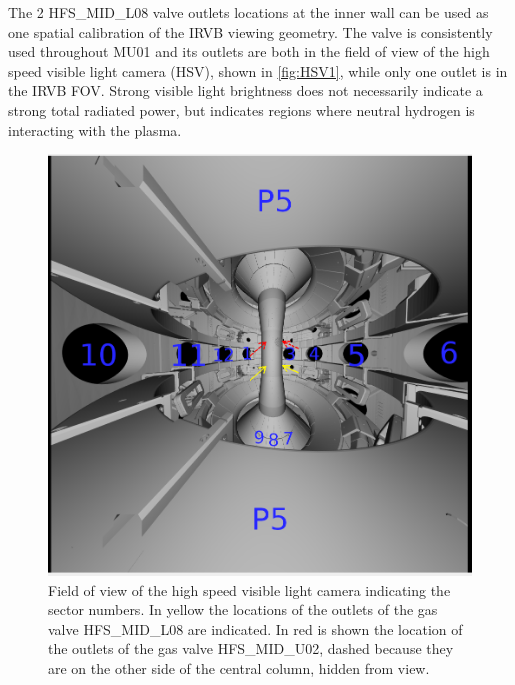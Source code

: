 
The 2 HFS\_MID\_L08 valve outlets locations at the inner wall can be used as one spatial calibration of the IRVB viewing geometry. The valve is consistently used throughout MU01 and its outlets are both in the field of view of the high speed visible light camera (HSV), shown in \autoref{fig:HSV1}, while only one outlet is in the IRVB FOV. Strong visible light brightness does not necessarily indicate a strong total radiated power, but indicates regions where neutral hydrogen is interacting with the plasma.\cite{Walkden2017}

\begin{figure}[!ht]
	\centering
	\includegraphics[width=0.6\linewidth,trim={0 0 0 0},clip]{Chapters/chapter2/figs/hsv_FOV2.png}
	\caption{Field of view of the high speed visible light camera indicating the sector numbers. In yellow the locations of the outlets of the gas valve HFS\_MID\_L08 are indicated. In red is shown the location of the outlets of the gas valve HFS\_MID\_U02, dashed because they are on the other side of the central column, hidden from view.}
	\label{fig:HSV1}
\end{figure}


